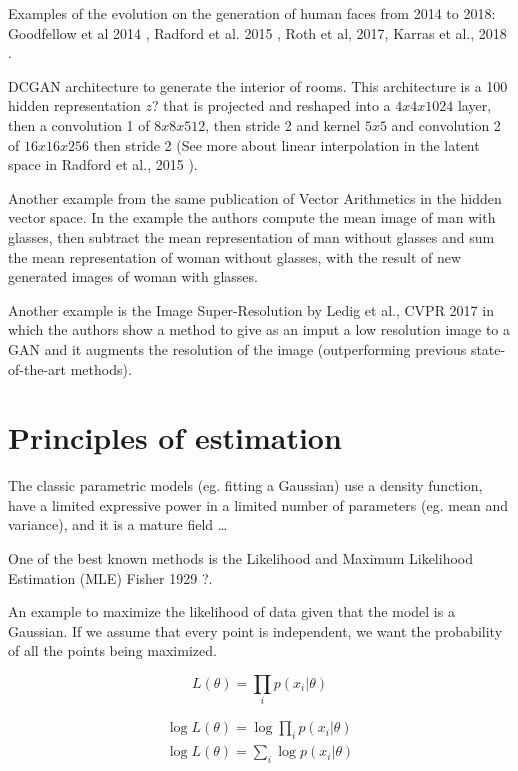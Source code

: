 Examples of the evolution on the generation of human faces from 2014 to 2018:
Goodfellow et al 2014 \cite{goodfellow2014generative}, Radford et al. 2015
\cite{radford2015unsupervised}, Roth et al, 2017, Karras et al., 2018
\cite{karras2017progressive}.

DCGAN architecture to generate the interior of rooms. This architecture is a
100 hidden representation $z$? that is projected and reshaped into a $4x4x1024$
layer, then a convolution 1 of $8x8x512$, then stride 2 and kernel $5x5$ and
convolution 2 of $16x16x256$ then stride 2  (See more about linear
interpolation in the latent space in Radford et al., 2015
\cite{radford2015unsupervised}).

Another example from the same publication \cite{radford2015unsupervised} of
Vector Arithmetics in the hidden vector space. In the example the authors
compute the mean image of man with glasses, then subtract the mean
representation of man without glasses and sum the mean representation of woman
without glasses, with the result of new generated images of woman with glasses.

Another example is the Image Super-Resolution by Ledig et al., CVPR 2017
\cite{ledig2017photo} in which the authors show a method to give as an imput a
low resolution image to a GAN and it augments the resolution of the image
(outperforming previous state-of-the-art methods).

\section{Principles of estimation}

The classic parametric models (eg. fitting a Gaussian) use a density function,
have a limited expressive power in a limited number of parameters (eg. mean and
variance), and it is a mature field \dots

One of the best known methods is the Likelihood and Maximum Likelihood
Estimation (MLE) Fisher 1929 \cite{fisher1929tests}?.

An example to maximize the likelihood of data given that the model is a
Gaussian. If we assume that every point is independent, we want the probability
of all the points being maximized.

\begin{equation}
  L(\theta) = \prod_i p(x_i|\theta)
\end{equation}

\begin{align}
  \log L(\theta) = \log \prod_i p(x_i|\theta) \\
  \log L(\theta) = \sum_i \log p(x_i|\theta)
\end{align}

